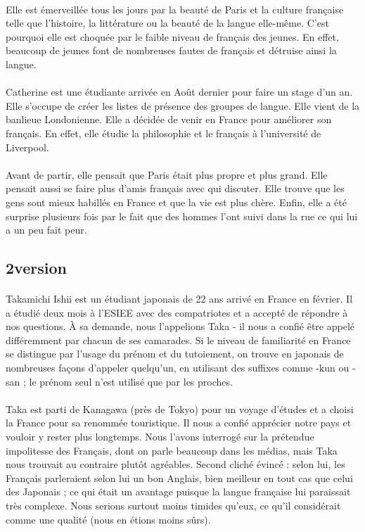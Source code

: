 \paragraph{}
Elle est émerveillée tous les jours par la beauté de Paris et la culture française telle que l’histoire, la littérature ou la beauté de la langue elle-même. C’est pourquoi elle est choquée par le faible niveau de français des jeunes. En effet, beaucoup de jeunes font de nombreuses fautes de français et détruise ainsi la langue.
\paragraph{}
Catherine est une étudiante arrivée en Août dernier pour faire un stage d’un an. Elle s’occupe de créer les listes de présence des groupes de langue. Elle vient de la banlieue Londonienne. Elle a décidée de venir en France pour améliorer son français. En effet, elle étudie la philosophie et le français à l’université de Liverpool.
\paragraph{}
Avant de partir, elle pensait que Paris était plus propre et plus grand. Elle pensait aussi se faire plus d’amis français avec qui discuter.  Elle trouve que les gens sont mieux habillés en France et que la vie est plus chère. Enfin,  elle a été surprise plusieurs fois par le fait que des hommes l’ont suivi dans la rue ce qui lui a un peu fait peur.


\subsection{2\ieme version}
\paragraph{}
Takamichi Ishii est un étudiant japonais de 22 ans arrivé en France en février. Il a étudié deux mois à l’ESIEE avec des compatriotes et a accepté de répondre à nos questions. À sa demande, nous l’appelions Taka - il nous a confié être appelé différemment par chacun de ses camarades. Si le niveau de familiarité en France se distingue par l’usage du prénom et du tutoiement, on trouve en japonais de nombreuses façons d’appeler quelqu’un, en utilisant des suffixes comme -kun ou -san ; le prénom seul n’est utilisé que par les proches.
\paragraph{}
Taka est parti de Kanagawa (près de Tokyo) pour un voyage d’études et a choisi la France pour sa renommée touristique. Il nous a confié apprécier notre pays et vouloir y rester plus longtemps. Nous l’avons interrogé sur la prétendue impolitesse des Français, dont on parle beaucoup dans les médias, mais Taka nous trouvait au contraire plutôt agréables. Second cliché évincé : selon lui, les Français parleraient selon lui un bon Anglais, bien meilleur en tout cas  que celui des Japonais ; ce qui était un avantage puisque la langue française lui paraissait très complexe. Nous serions surtout moins timides qu’eux, ce qu’il considérait comme une qualité (nous en étions moins sûrs).
